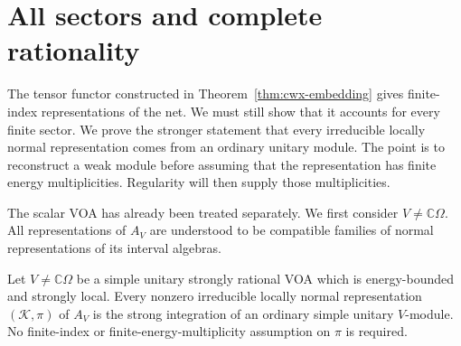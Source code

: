 \section{All sectors and complete rationality}\label{sec:exhaustion}

The tensor functor constructed in Theorem~\ref{thm:cwx-embedding} gives
finite-index representations of the net.  We must still show that it accounts
for every finite sector.  We prove the stronger statement that every
irreducible locally normal representation comes from an ordinary unitary
module.  The point is to reconstruct a weak module before assuming that the
representation has finite energy multiplicities.  Regularity will then supply
those multiplicities.

The scalar VOA has already been treated separately.  We first consider
\(V\ne\mathbb C\Omega\).  All representations of \(A_V\) are understood
to be compatible families of normal representations of its interval algebras.

\begin{proposition}\label{prop:exhaustion}
Let \(V\ne\mathbb C\Omega\) be a simple unitary strongly rational VOA
which is energy-bounded and strongly local.  Every nonzero irreducible
locally normal representation
\((\mathcal K,\pi)\) of \(A_V\) is the strong integration of an ordinary
simple unitary \(V\)-module.  No finite-index or finite-energy-multiplicity
assumption on \(\pi\) is required.
\end{proposition}

